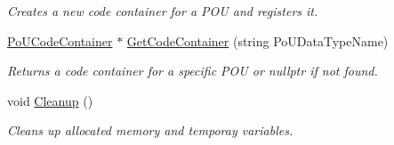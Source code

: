 \begin{DoxyCompactItemize}
\begin{DoxyCompactList}\small\item\em Creates a new code container for a P\+OU and registers it. \end{DoxyCompactList}\item 
\hyperlink{classpc__emulator_1_1PoUCodeContainer}{Po\+U\+Code\+Container} $\ast$ \hyperlink{classpc__emulator_1_1PCResourceImpl_a93b852f67ddca8d086b19a0c7daf7c42}{Get\+Code\+Container} (string Po\+U\+Data\+Type\+Name)\hypertarget{classpc__emulator_1_1PCResourceImpl_a93b852f67ddca8d086b19a0c7daf7c42}{}\label{classpc__emulator_1_1PCResourceImpl_a93b852f67ddca8d086b19a0c7daf7c42}

\begin{DoxyCompactList}\small\item\em Returns a code container for a specific P\+OU or nullptr if not found. \end{DoxyCompactList}\item 
void \hyperlink{classpc__emulator_1_1PCResourceImpl_a3d9ad2276414e07af0a9b435e17faad0}{Cleanup} ()\hypertarget{classpc__emulator_1_1PCResourceImpl_a3d9ad2276414e07af0a9b435e17faad0}{}\label{classpc__emulator_1_1PCResourceImpl_a3d9ad2276414e07af0a9b435e17faad0}

\begin{DoxyCompactList}\small\item\em Cleans up allocated memory and temporay variables. \end{DoxyCompactList}\end{DoxyCompactItemize}
